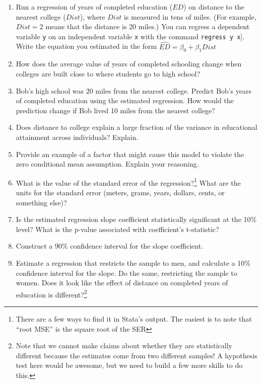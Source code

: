 \documentclass[
]{article}
\begin{document}
\begin{enumerate}
\def\labelenumi{\alph{enumi}.}
\item
  Run a regression of years of completed education (\(ED\)) on distance
  to the nearest college (\(Dist\)), where \(Dist\) is measured in tens
  of miles. (For example, \(Dist=2\) means that the distance is 20
  miles.) You can regress a dependent variable \texttt{y} on an
  independent variable \texttt{x} with the command
  \texttt{regress\ y\ x}{]}. Write the equation you estimated in the
  form \(\widehat{ED} = \beta_0 + \beta_1 Dist\)
\item
  How does the average value of years of completed schooling change when
  colleges are built close to where students go to high school?
\item
  Bob's high school was 20 miles from the nearest college. Predict Bob's
  years of completed education using the estimated regression. How would
  the prediction change if Bob lived 10 miles from the nearest college?
\item
  Does distance to college explain a large fraction of the variance in
  educational attainment across individuals? Explain.
\item
  Provide an example of a factor that might cause this model to violate
  the zero conditional mean assumption. Explain your reasoning.
\item
  What is the value of the standard error of the regression?\footnote{There
    are a few ways to find it in Stata's output. The easiest is to note
    that ``root MSE'' is the square root of the SER} What are the units
  for the standard error (meters, grams, years, dollars, cents, or
  something else)?
\item
  Is the estimated regression slope coefficient statistically
  significant at the 10\% level? What is the p-value associated with
  coefficient's t-statistic?
\item
  Construct a 90\% confidence interval for the slope coefficient.
\item
  Estimate a regression that restricts the sample to men, and calculate
  a 10\% confidence interval for the slope. Do the same, restricting the
  sample to women. Does it look like the effect of distance on completed
  years of education is different?\footnote{Note that we cannot make
    claims about whether they are statistically different because the
    estimates come from two different samples! A hypothesis test here
    would be awesome, but we need to build a few more skills to do this.}
\end{enumerate}
\end{document}

